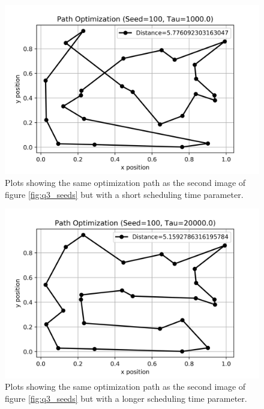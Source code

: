 \documentclass{article}
\begin{document}
\begin{figure}[H]
	\centering
	\includegraphics[width=\linewidth]{../images/q3_s=100_t=1000.png}
	\caption{Plots showing the same optimization path as the second image of figure \ref{fig:q3_seeds} but with a short scheduling time parameter.}
	\label{fig:q3_t=1000}
\end{figure}

\begin{figure}[H]
	\centering
	\includegraphics[width=\linewidth]{../images/q3_s=100_t=20000.png}
	\caption{Plots showing the same optimization path as the second image of figure \ref{fig:q3_seeds} but with a longer scheduling time parameter.}
	\label{fig:q3_t=20000}
\end{figure}
\end{document}
